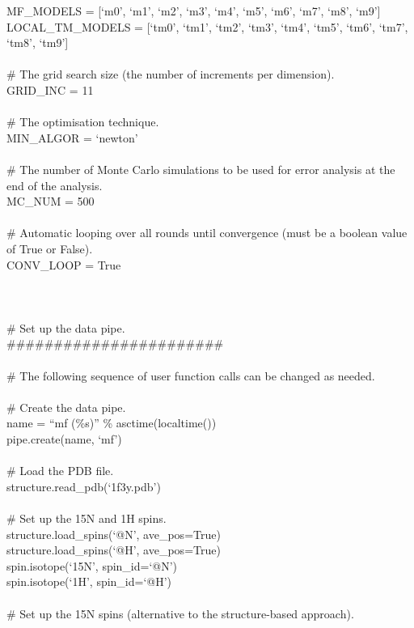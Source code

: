 \begin{htmlonly}
\begin{htmlonly}
\begin{exampleenv}
MF\_MODELS = [`m0', `m1', `m2', `m3', `m4', `m5', `m6', `m7', `m8', `m9'] \\
LOCAL\_TM\_MODELS = [`tm0', `tm1', `tm2', `tm3', `tm4', `tm5', `tm6', `tm7', `tm8', `tm9'] \\
 \\
\# The grid search size (the number of increments per dimension). \\
GRID\_INC = 11 \\
 \\
\# The optimisation technique. \\
MIN\_ALGOR = `newton' \\
 \\
\# The number of Monte Carlo simulations to be used for error analysis at the end of the analysis. \\
MC\_NUM = 500 \\
 \\
\# Automatic looping over all rounds until convergence (must be a boolean value of True or False). \\
CONV\_LOOP = True \\
 \\
 \\
 \\
\# Set up the data pipe. \\
\#\#\#\#\#\#\#\#\#\#\#\#\#\#\#\#\#\#\#\#\#\#\# \\
 \\
\# The following sequence of user function calls can be changed as needed. \\
 \\
\# Create the data pipe. \\
name = ``mf (\%s)'' \% asctime(localtime()) \\
pipe.create(name, `mf') \\
 \\
\# Load the PDB file. \\
structure.read\_pdb(`1f3y.pdb') \\
 \\
\# Set up the 15N and 1H spins. \\
structure.load\_spins(`@N', ave\_pos=True) \\
structure.load\_spins(`@H', ave\_pos=True) \\
spin.isotope(`15N', spin\_id=`@N') \\
spin.isotope(`1H', spin\_id=`@H') \\
 \\
\# Set up the 15N spins (alternative to the structure-based approach). \\

\end{exampleenv}
\end{htmlonly}
\end{htmlonly}
